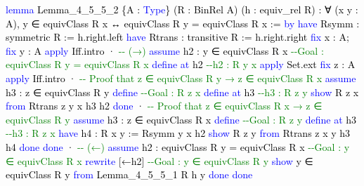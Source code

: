 \documentclass[
  letterpaper,
  DIV=11,
  numbers=noendperiod]{scrreprt}
\newenvironment{Shaded}{\begin{snugshade}}{\end{snugshade}}
\newcommand{\CommentTok}[1]{\textcolor[rgb]{0.37,0.37,0.37}{#1}}
\newcommand{\KeywordTok}[1]{\textcolor[rgb]{0.00,0.23,0.31}{#1}}
\newcommand{\NormalTok}[1]{\textcolor[rgb]{0.00,0.23,0.31}{#1}}
\renewcommand{\NormalTok}[1]{\textcolor[HTML]{000000}{#1}}
\renewcommand{\KeywordTok}[1]{\textcolor[HTML]{0000FF}{#1}}
\renewcommand{\CommentTok}[1]{\textcolor[HTML]{008000}{#1}}
\theoremstyle{remark}
\begin{document}
\begin{Shaded}
\begin{Highlighting}[]
\KeywordTok{lemma}\NormalTok{ Lemma\_4\_5\_5\_2 \{A : }\KeywordTok{Type}\NormalTok{\} (R : BinRel A) (h : equiv\_rel R) :}
\NormalTok{    ∀ (x y : A), y ∈ equivClass R x ↔}
\NormalTok{      equivClass R y = equivClass R x := }\KeywordTok{by}
  \KeywordTok{have}\NormalTok{ Rsymm : symmetric R := h.right.left}
  \KeywordTok{have}\NormalTok{ Rtrans : transitive R := h.right.right}
  \KeywordTok{fix}\NormalTok{ x : A; }\KeywordTok{fix}\NormalTok{ y : A}
  \KeywordTok{apply}\NormalTok{ Iff.intro}
\NormalTok{  · }\CommentTok{{-}{-} (→)}
    \KeywordTok{assume}\NormalTok{ h2 :}
\NormalTok{      y ∈ equivClass R x    }\CommentTok{{-}{-}Goal : equivClass R y = equivClass R x}
    \KeywordTok{define} \KeywordTok{at}\NormalTok{ h2                        }\CommentTok{{-}{-}h2 : R y x}
    \KeywordTok{apply}\NormalTok{ Set.ext}
    \KeywordTok{fix}\NormalTok{ z : A}
    \KeywordTok{apply}\NormalTok{ Iff.intro}
\NormalTok{    · }\CommentTok{{-}{-} Proof that z ∈ equivClass R y → z ∈ equivClass R x}
      \KeywordTok{assume}\NormalTok{ h3 : z ∈ equivClass R y}
      \KeywordTok{define}                            \CommentTok{{-}{-}Goal : R z x}
      \KeywordTok{define} \KeywordTok{at}\NormalTok{ h3                      }\CommentTok{{-}{-}h3 : R z y}
      \KeywordTok{show}\NormalTok{ R z x }\KeywordTok{from}\NormalTok{ Rtrans z y x h3 h2}
      \KeywordTok{done}
\NormalTok{    · }\CommentTok{{-}{-} Proof that z ∈ equivClass R x → z ∈ equivClass R y}
      \KeywordTok{assume}\NormalTok{ h3 : z ∈ equivClass R x}
      \KeywordTok{define}                            \CommentTok{{-}{-}Goal : R z y}
      \KeywordTok{define} \KeywordTok{at}\NormalTok{ h3                      }\CommentTok{{-}{-}h3 : R z x}
      \KeywordTok{have}\NormalTok{ h4 : R x y := Rsymm y x h2}
      \KeywordTok{show}\NormalTok{ R z y }\KeywordTok{from}\NormalTok{ Rtrans z x y h3 h4}
      \KeywordTok{done}
    \KeywordTok{done}
\NormalTok{  · }\CommentTok{{-}{-} (←)}
    \KeywordTok{assume}\NormalTok{ h2 :}
\NormalTok{      equivClass R y = equivClass R x   }\CommentTok{{-}{-}Goal : y ∈ equivClass R x}
    \KeywordTok{rewrite}\NormalTok{ [←h2]                       }\CommentTok{{-}{-}Goal : y ∈ equivClass R y}
    \KeywordTok{show}\NormalTok{ y ∈ equivClass R y }\KeywordTok{from}\NormalTok{ Lemma\_4\_5\_5\_1 R h y}
    \KeywordTok{done}
  \KeywordTok{done}
\end{Highlighting}
\end{Shaded}
\end{document}
